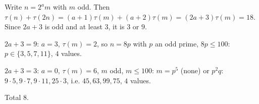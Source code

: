 Write $n=2^a m$ with $m$ odd. Then $\tau(n)+\tau(2n)=(a+1)\tau(m)+(a+2)\tau(m)=(2a+3)\tau(m)=18$. Since $2a+3$ is odd and at least $3$, it is $3$ or $9$.

$2a+3=9$: $a=3$, $\tau(m)=2$, so $n=8p$ with $p$ an odd prime, $8p\le100$: $p\in\{3,5,7,11\}$, $4$ values.

$2a+3=3$: $a=0$, $\tau(m)=6$, $m$ odd, $m\le100$: $m=p^5$ (none) or $p^2q$: $9\cdot5,9\cdot7,9\cdot11,25\cdot3$, i.e. $45,63,99,75$, $4$ values.

Total $\boxed{8}$.
